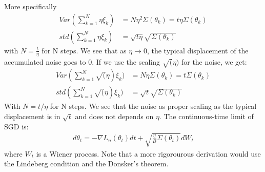 \documentclass[11pt]{article}
\begin{document}
More specifically
\begin{align}
Var(\sum_{k=1}^N \eta \xi_k) & = N\eta^2\Sigma(\theta_k) = t\eta\Sigma(\theta_k)\\
std( \sum_{k=1}^N \eta \xi_k) & = \sqrt{t\eta}\sqrt{\Sigma(\theta_k)}
\end{align}
with $N = \frac{t}{\eta}$ for N steps. We see that as $\eta \to 0$, the typical displacement of the accumulated noise goes to 0.
If we use the scaling $\sqrt(\eta)$ for the noise, we get:
\begin{align}
Var(\sum_{k=1}^N \sqrt(\eta) \xi_k) & = N\eta\Sigma(\theta_k) = t\Sigma(\theta_k)\\
std( \sum_{k=1}^N \sqrt(\eta) \xi_k) & = \sqrt{t}\sqrt{\Sigma(\theta_k)}
\end{align}
With $N= t/\eta$ for N steps. We see that the noise as proper scaling as the typical displacement is in $\sqrt{t}$ and does not depends on $\eta$.
The continuous-time limit of SGD is:
\begin{align}
d\theta_t = - \nabla L_n(\theta_t) dt + \sqrt{\frac{\eta}{B}\Sigma(\theta_t)} dW_t
\end{align}
where $W_t$ is a Wiener process. Note that a more rigorourous derivation would use the Lindeberg condition and the Donsker's theorem.
\end{document}
